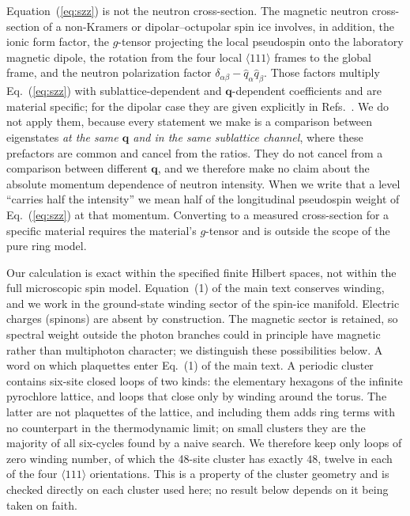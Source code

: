 \documentclass[aps,prl,twocolumn,amsmath,amssymb,superscriptaddress,
longbibliography,floatfix]{revtex4-2}
\newcommand{\bq}{\bm q}
\begin{document}
Equation~(\ref{eq:szz}) is not the neutron cross-section. The
magnetic neutron cross-section of a non-Kramers or dipolar--octupolar
spin ice involves, in addition, the ionic form factor, the $g$-tensor
projecting the local pseudospin onto the laboratory magnetic dipole,
the rotation from the four local $\langle111\rangle$ frames to the
global frame, and the neutron polarization factor
$\delta_{\alpha\beta}-\hat q_\alpha\hat q_\beta$. Those factors
multiply Eq.~(\ref{eq:szz}) with sublattice-dependent and
$\bq$-dependent coefficients and are material specific; for the
dipolar case they are given explicitly in
Refs.~\cite{Fennell2009,Benton2012}. We do not apply them, because
every statement we make is a comparison between eigenstates \emph{at
the same $\bq$ and in the same sublattice channel}, where these
prefactors are common and cancel from the ratios. They do not cancel
from a comparison between different $\bq$, and we therefore make no
claim about the absolute momentum dependence of neutron intensity.
When we write that a level ``carries half the intensity'' we mean half
of the longitudinal pseudospin weight of Eq.~(\ref{eq:szz}) at that
momentum. Converting to a measured cross-section for a specific
material requires the material's $g$-tensor and is outside the scope
of the pure ring model.

Our calculation is exact within the specified finite Hilbert spaces,
not within the full microscopic spin model. Equation~(1) of the main text
conserves winding, and we work in the ground-state winding sector of
the spin-ice manifold. Electric charges (spinons) are absent by
construction. The magnetic sector is retained, so spectral weight
outside the photon branches could in principle have magnetic rather
than multiphoton character; we distinguish these possibilities below.
A word on which plaquettes enter Eq.~(1) of the main text. A periodic
cluster contains six-site closed loops of two kinds: the elementary
hexagons of the infinite pyrochlore lattice, and loops that close only
by winding around the torus. The latter are not plaquettes of the
lattice, and including them adds ring terms with no counterpart in the
thermodynamic limit; on small clusters they are the majority of all
six-cycles found by a naive search. We therefore keep only loops of
zero winding number, of which the 48-site cluster has exactly $48$,
twelve in each of the four $\langle111\rangle$ orientations. This is
a property of the cluster geometry and is checked directly on each
cluster used here; no result below depends on it being taken on faith.
\end{document}
